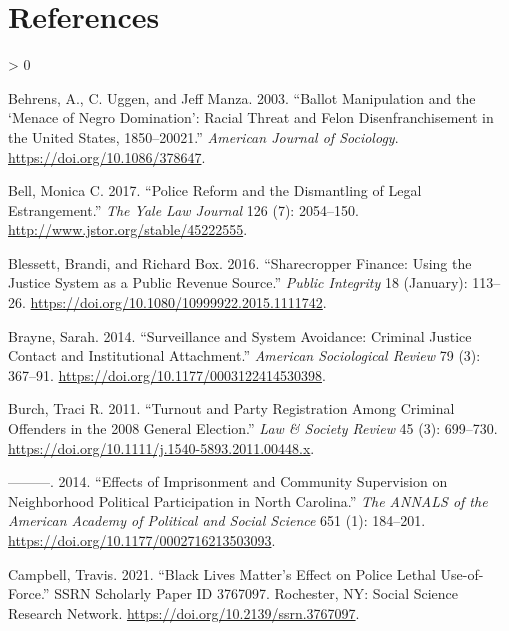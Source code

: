 \documentclass[
  12pt,
]{article}
\newlength{\cslhangindent}
\newenvironment{CSLReferences}[2] %
 {%
  \setlength{\parindent}{0pt}
  \ifodd #1 \everypar{\setlength{\hangindent}{\cslhangindent}}\ignorespaces\fi
  \ifnum #2 > 0
  \setlength{\parskip}{#2\baselineskip}
  \fi
 }%
 {}
\begin{document}
\newpage

\hypertarget{references}{%
\section*{References}\label{references}}

\hypertarget{refs}{}
\begin{CSLReferences}{1}{0}
\leavevmode\hypertarget{ref-Behrens2003}{}%
Behrens, A., C. Uggen, and Jeff Manza. 2003. {``Ballot {Manipulation} and the {`{Menace} of {Negro Domination}'}: {Racial Threat} and {Felon Disenfranchisement} in the {United States}, 1850--20021.''} \emph{American Journal of Sociology}. \url{https://doi.org/10.1086/378647}.

\leavevmode\hypertarget{ref-Bell2017}{}%
Bell, Monica C. 2017. {``Police {Reform} and the {Dismantling} of {Legal Estrangement}.''} \emph{The Yale Law Journal} 126 (7): 2054--150. \url{http://www.jstor.org/stable/45222555}.

\leavevmode\hypertarget{ref-Blessett2016}{}%
Blessett, Brandi, and Richard Box. 2016. {``Sharecropper {Finance}: {Using} the {Justice System} as a {Public Revenue Source}.''} \emph{Public Integrity} 18 (January): 113--26. \url{https://doi.org/10.1080/10999922.2015.1111742}.

\leavevmode\hypertarget{ref-Brayne2014}{}%
Brayne, Sarah. 2014. {``Surveillance and {System Avoidance}: {Criminal Justice Contact} and {Institutional Attachment}.''} \emph{American Sociological Review} 79 (3): 367--91. \url{https://doi.org/10.1177/0003122414530398}.

\leavevmode\hypertarget{ref-Burch2011}{}%
Burch, Traci R. 2011. {``Turnout and {Party Registration} Among {Criminal Offenders} in the 2008 {General Election}.''} \emph{Law \& Society Review} 45 (3): 699--730. \url{https://doi.org/10.1111/j.1540-5893.2011.00448.x}.

\leavevmode\hypertarget{ref-Burch2014}{}%
---------. 2014. {``Effects of {Imprisonment} and {Community Supervision} on {Neighborhood Political Participation} in {North Carolina}.''} \emph{The ANNALS of the American Academy of Political and Social Science} 651 (1): 184--201. \url{https://doi.org/10.1177/0002716213503093}.

\leavevmode\hypertarget{ref-Campbell2021}{}%
Campbell, Travis. 2021. {``Black {Lives Matter}'s {Effect} on {Police Lethal Use}-of-{Force}.''} SSRN Scholarly Paper ID 3767097. {Rochester, NY}: {Social Science Research Network}. \url{https://doi.org/10.2139/ssrn.3767097}.


\end{CSLReferences}
\end{document}
